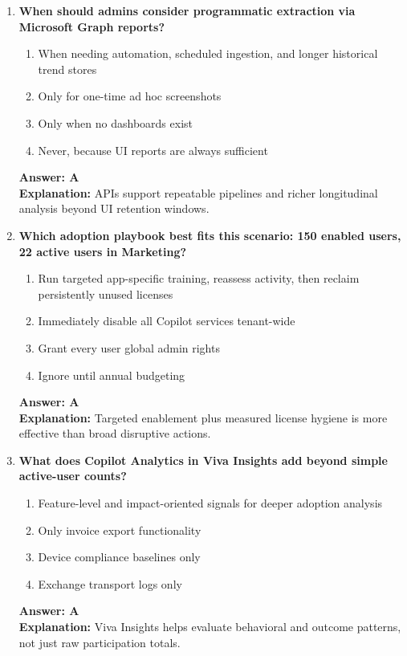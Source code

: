 \documentclass[10pt]{article}
\begin{document}
\begin{enumerate}[leftmargin=*]
\item \textbf{When should admins consider programmatic extraction via Microsoft Graph reports?}
\begin{enumerate}[label=\Alph*.]
  \item When needing automation, scheduled ingestion, and longer historical trend stores
  \item Only for one-time ad hoc screenshots
  \item Only when no dashboards exist
  \item Never, because UI reports are always sufficient
\end{enumerate}
\textbf{Answer: A}\\
\textbf{Explanation:} APIs support repeatable pipelines and richer longitudinal analysis beyond UI retention windows.

\item \textbf{Which adoption playbook best fits this scenario: 150 enabled users, 22 active users in Marketing?}
\begin{enumerate}[label=\Alph*.]
  \item Run targeted app-specific training, reassess activity, then reclaim persistently unused licenses
  \item Immediately disable all Copilot services tenant-wide
  \item Grant every user global admin rights
  \item Ignore until annual budgeting
\end{enumerate}
\textbf{Answer: A}\\
\textbf{Explanation:} Targeted enablement plus measured license hygiene is more effective than broad disruptive actions.

\item \textbf{What does Copilot Analytics in Viva Insights add beyond simple active-user counts?}
\begin{enumerate}[label=\Alph*.]
  \item Feature-level and impact-oriented signals for deeper adoption analysis
  \item Only invoice export functionality
  \item Device compliance baselines only
  \item Exchange transport logs only
\end{enumerate}
\textbf{Answer: A}\\
\textbf{Explanation:} Viva Insights helps evaluate behavioral and outcome patterns, not just raw participation totals.


\end{enumerate}
\end{document}
